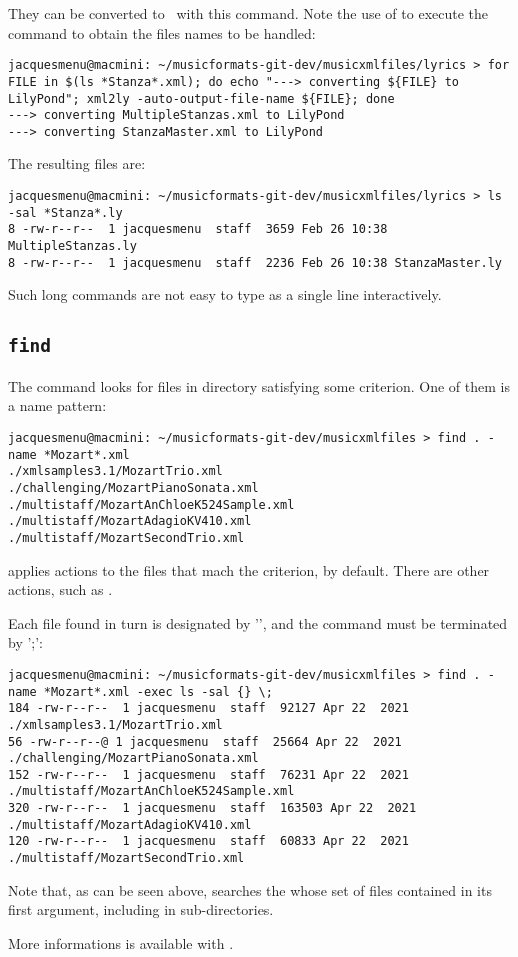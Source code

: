 They can be converted to \lily\ with this  command. Note the use of  to execute the  command to obtain the files names to be handled:
\begin{lstlisting}[language=Terminal]
jacquesmenu@macmini: ~/musicformats-git-dev/musicxmlfiles/lyrics > for FILE in $(ls *Stanza*.xml); do echo "---> converting ${FILE} to LilyPond"; xml2ly -auto-output-file-name ${FILE}; done
---> converting MultipleStanzas.xml to LilyPond
---> converting StanzaMaster.xml to LilyPond
\end{lstlisting}

The resulting files are:
\begin{lstlisting}[language=Terminal]
jacquesmenu@macmini: ~/musicformats-git-dev/musicxmlfiles/lyrics > ls -sal *Stanza*.ly
8 -rw-r--r--  1 jacquesmenu  staff  3659 Feb 26 10:38 MultipleStanzas.ly
8 -rw-r--r--  1 jacquesmenu  staff  2236 Feb 26 10:38 StanzaMaster.ly
\end{lstlisting}

Such long  commands are not easy to type as a single line interactively.


\subsection{{\tt find}}

The  command looks for files in directory satisfying some criterion. One of them is a name pattern:
\begin{lstlisting}[language=Terminal]
jacquesmenu@macmini: ~/musicformats-git-dev/musicxmlfiles > find . -name *Mozart*.xml
./xmlsamples3.1/MozartTrio.xml
./challenging/MozartPianoSonata.xml
./multistaff/MozartAnChloeK524Sample.xml
./multistaff/MozartAdagioKV410.xml
./multistaff/MozartSecondTrio.xml
\end{lstlisting}

 applies actions to the files that mach the criterion,  by default. There are other actions, such as .

Each file found in turn is designated by '\code{\{\}}', and the command must be terminated by '\code{\textbackslash};':
\begin{lstlisting}[language=Terminal]
jacquesmenu@macmini: ~/musicformats-git-dev/musicxmlfiles > find . -name *Mozart*.xml -exec ls -sal {} \;
184 -rw-r--r--  1 jacquesmenu  staff  92127 Apr 22  2021 ./xmlsamples3.1/MozartTrio.xml
56 -rw-r--r--@ 1 jacquesmenu  staff  25664 Apr 22  2021 ./challenging/MozartPianoSonata.xml
152 -rw-r--r--  1 jacquesmenu  staff  76231 Apr 22  2021 ./multistaff/MozartAnChloeK524Sample.xml
320 -rw-r--r--  1 jacquesmenu  staff  163503 Apr 22  2021 ./multistaff/MozartAdagioKV410.xml
120 -rw-r--r--  1 jacquesmenu  staff  60833 Apr 22  2021 ./multistaff/MozartSecondTrio.xml
\end{lstlisting}

Note that, as can be seen above,  searches the whose set of files contained in its first argument, including in sub-directories.

More informations is available with .

